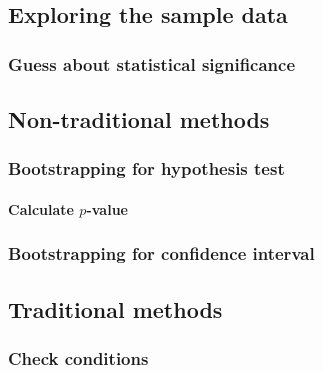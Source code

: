 \documentclass[
  12pt, krantz2,
]{krantz}
\begin{document}
\hypertarget{exploring-the-sample-data-4}{%
\subsection{Exploring the sample data}\label{exploring-the-sample-data-4}}

\hypertarget{guess-about-statistical-significance-4}{%
\subsubsection*{Guess about statistical significance}\label{guess-about-statistical-significance-4}}


\hypertarget{non-traditional-methods-4}{%
\subsection{Non-traditional methods}\label{non-traditional-methods-4}}

\hypertarget{bootstrapping-for-hypothesis-test-1}{%
\subsubsection*{Bootstrapping for hypothesis test}\label{bootstrapping-for-hypothesis-test-1}}


\hypertarget{calculate-p-value-4}{%
\paragraph{\texorpdfstring{Calculate \(p\)-value}{Calculate p-value}}\label{calculate-p-value-4}}

\hypertarget{bootstrapping-for-confidence-interval-4}{%
\subsubsection*{Bootstrapping for confidence interval}\label{bootstrapping-for-confidence-interval-4}}


\hypertarget{traditional-methods-4}{%
\subsection{Traditional methods}\label{traditional-methods-4}}

\hypertarget{check-conditions-4}{%
\subsubsection*{Check conditions}\label{check-conditions-4}}
\end{document}
